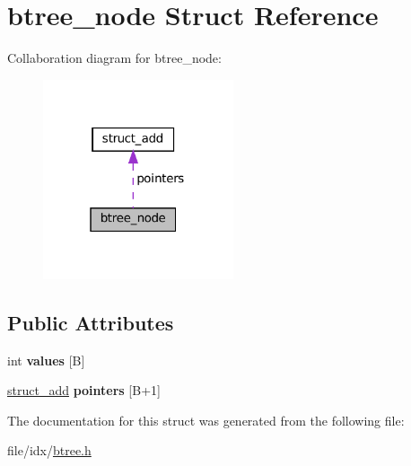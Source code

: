 \hypertarget{structbtree__node}{}\section{btree\+\_\+node Struct Reference}
\label{structbtree__node}


Collaboration diagram for btree\+\_\+node\+:\nopagebreak
\begin{figure}[H]
\begin{center}
\leavevmode
\includegraphics[width=159pt]{structbtree__node__coll__graph}
\end{center}
\end{figure}
\subsection*{Public Attributes}
\begin{DoxyCompactItemize}
\item 
\mbox{\label{structbtree__node_a61819a9f2241e41b96a2eceeccbc9d2e}} 
int {\bfseries values} \mbox{[}B\mbox{]}
\item 
\mbox{\label{structbtree__node_ad339f2c6b4a564e947cf5cb0d5d44b51}} 
\hyperlink{structstruct__add}{struct\+\_\+add} {\bfseries pointers} \mbox{[}B+1\mbox{]}
\end{DoxyCompactItemize}


The documentation for this struct was generated from the following file\+:\begin{DoxyCompactItemize}
\item 
file/idx/\hyperlink{btree_8h}{btree.\+h}\end{DoxyCompactItemize}
